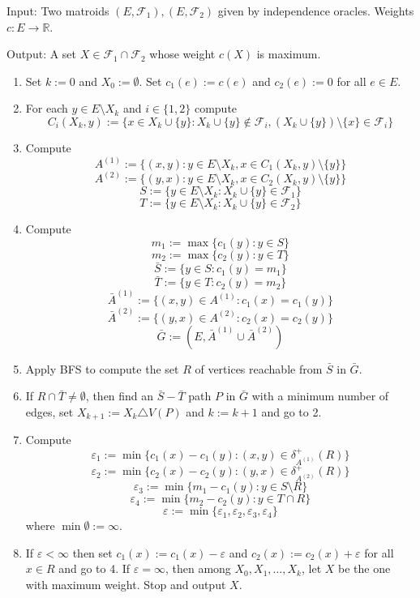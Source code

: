 \documentclass[english,12pt]{article}
\begin{document}
    Input: Two matroids $(E, \mathcal{F}_1), (E, \mathcal{F}_2)$ given by independence oracles.
    Weights $c : E \to \mathbb{R}$.

    Output: A set $X \in \mathcal{F}_1 \cap \mathcal{F}_2$ whose weight $c(X)$ is maximum.

    \begin{enumerate}
        \item {
            Set $k := 0$ and $X_0 := \emptyset$.
            Set $c_1(e) := c(e)$ and $c_2(e) := 0$ for all $e \in E$.
        }
        \item {
            For each $y \in E \setminus X_k$ and $i \in \{1, 2\}$ compute
            $$ C_i(X_k, y) := \{x \in X_k \cup \{y\} : X_k \cup \{y\} \not\in \mathcal{F}_i, (X_k \cup \{y\}) \setminus \{x\} \in \mathcal{F}_i\}$$
        }
        \item {
            Compute
            $$ A^{(1)} := \{(x, y) : y \in E \setminus X_k, x \in C_1(X_k, y) \setminus \{y\}\} $$
            $$ A^{(2)} := \{(y, x) : y \in E \setminus X_k, x \in C_2(X_k, y) \setminus \{y\}\} $$
            $$ S := \{y \in E \setminus X_k : X_k \cup \{y\} \in \mathcal{F}_1\} $$
            $$ T := \{y \in E \setminus X_k : X_k \cup \{y\} \in \mathcal{F}_2\} $$
        }
        \item {
            Compute
            $$ m_1 := \max\{c_1(y) : y \in S\} $$
            $$ m_2 := \max\{c_2(y) : y \in T\} $$
            $$ \bar{S} := \{y \in S : c_1(y) = m_1 \} $$
            $$ \bar{T} := \{y \in T : c_2(y) = m_2 \} $$
            $$ \bar{A}^{(1)} := \{(x, y) \in A^{(1)} : c_1(x) = c_1(y) \} $$
            $$ \bar{A}^{(2)} := \{(y, x) \in A^{(2)} : c_2(x) = c_2(y) \} $$
            $$ \bar{G} := (E, \bar{A}^{(1)} \cup \bar{A}^{(2)}) $$
        }
        \item {
            Apply BFS to compute the set $R$ of vertices reachable from $\bar{S}$ in $\bar{G}$.
        }
        \item {
            If $R \cap \bar{T} \neq \emptyset$, then find an $\bar{S} - \bar{T}$ path $P$ in $\bar{G}$ with a minimum number of edges, set $X_{k + 1} := X_k \triangle V(P)$ and $k := k + 1$ and go to 2.
        }
        \item {
            Compute
            $$ \varepsilon_1 := \min \{c_1(x) - c_1(y) : (x, y) \in \delta_{A^{(1)}}^+(R)\} $$
            $$ \varepsilon_2 := \min \{c_2(x) - c_2(y) : (y, x) \in \delta_{A^{(2)}}^+(R)\} $$
            $$ \varepsilon_3 := \min \{m_1 - c_1(y) : y \in S \setminus R \} $$
            $$ \varepsilon_4 := \min \{m_2 - c_2(y) : y \in T \cap R \} $$
            $$ \varepsilon := \min \{ \varepsilon_1, \varepsilon_2, \varepsilon_3, \varepsilon_4 \} $$
            where $\min \emptyset := \infty $.
        }
        \item {
            If $\varepsilon < \infty$ then set $c_1(x) := c_1(x) - \varepsilon$ and $c_2(x) := c_2(x) + \varepsilon$ for all $x \in R$ and go to 4.
            If $\varepsilon = \infty$, then among $X_0, X_1, \dots, X_k$, let $X$ be the one with maximum weight. Stop and output $X$.
        }
    \end{enumerate}
\end{document}
